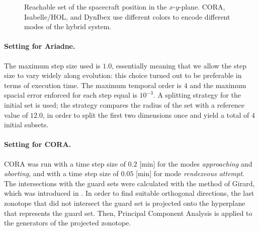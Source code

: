 \documentclass[EPiC]{easychair}
\begin{document}
\begin{figure}[htbp]
{  \label{fig:spacecraft:flowstar}}
  \hspace{0.2in}
  \hspace{0.2in}
\caption{Reachable set of the spacecraft position in the $x$-$y$-plane.
CORA, Isabelle/HOL, and DynIbex use different colors to encode different modes of the hybrid system.}
\label{fig:spacecraft}
\end{figure}

\paragraph{Setting for Ariadne.}
The maximum step size used is $1.0$, essentially meaning that we allow the step size to vary widely along evolution: this choice turned out to be preferable in terms of execution time. The maximum temporal order is $4$ and the maximum spacial error enforced for each step equal is $10^{-3}$. A splitting strategy for the initial set is used; the strategy compares the radius of the set with a reference value of $12.0$, in order to split the first two dimensions once and yield a total of $4$ initial subsets.

\paragraph{Setting for CORA.}
CORA was run with a time step size of $0.2$ [min] for the modes \textit{approaching} and \textit{aborting}, and with a time step size of $0.05$ [min] for mode \textit{rendezvous attempt}. The intersections with the guard sets were calculated with the method of Girard, which was introduced in \cite{Girard2008}. In order to find suitable orthogonal directions, the last zonotope that did not intersect the guard set is projected onto the hyperplane that represents the guard set. Then, Principal Component Analysis is applied to the generators of the projected zonotope.
\end{document}
